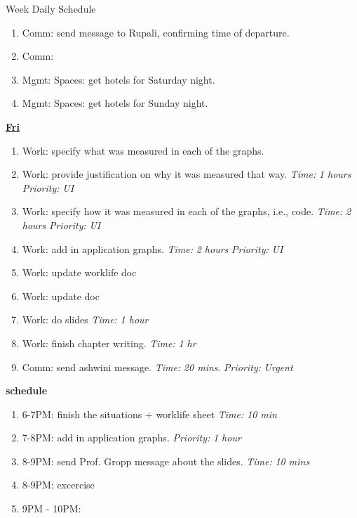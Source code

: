 \documentclass[serif, mathserif, final]{beamer}
\newcommand{\timeEst}[1]{\textit{Time:} \textit{#1}}
\newcommand{\priority}[1]{\textit{Priority:} \textit{#1}}
\begin{document}
\begin{frame}{}
\begin{columns}
\begin{column}{0.50\linewidth}
\begin{block}{Week Daily Schedule}
\begin{enumerate}
  \item \tiny Comm: send message to Rupali, confirming time of
    departure. 
  \item \tiny Comm: 
    
  \item \tiny Mgmt: Spaces: get hotels for Saturday night.  
  \item \tiny Mgmt: Spaces: get hotels for Sunday night.  
  \end{enumerate}
  
  \textbf{\small {\underline{Fri}}} 
  \begin{enumerate} 

  \tiny \item \tiny Work: specify what was measured in each of the graphs. 
  \item \tiny Work: provide justification on why it was measured that way. \timeEst{1 hours} \priority{UI} 
  \item \tiny Work: specify how it was measured in each of the graphs, i.e., code. \timeEst{2 hours} \priority{UI} 

  \item \tiny Work: add in application graphs.  \timeEst{2 hours} \priority{UI} 

\item \tiny Work: update worklife doc 
\item \tiny Work: update doc 

  \item \tiny Work: do slides \timeEst{1 hour}
  \item \tiny Work: finish chapter writing. \timeEst{1 hr} 
  \item \tiny Comm: send ashwini message. \timeEst{20 mins}. \priority{Urgent} 
  \end{enumerate} 

\textbf{schedule} 
\begin{enumerate} 
\tiny \item \tiny 6-7PM: finish the situations + worklife sheet \timeEst{10 min} 
\item \tiny 7-8PM: add in application graphs. \priority{1 hour} 
\item \tiny 8-9PM: send Prof. Gropp message about the slides. \timeEst{10 mins} 
\item \tiny 8-9PM: excercise 
\item \tiny 9PM - 10PM: 
\end{enumerate}   



\end{block}
\end{column}
\end{columns}
\end{frame}
\end{document}

